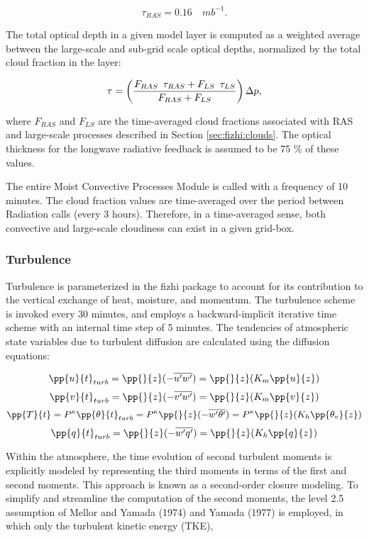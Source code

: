 \[ \tau_{RAS} = 0.16 \quad mb^{-1} . \]

The total optical depth in a given model layer is computed as a weighted average between
the large-scale and sub-grid scale optical depths, normalized by the total cloud fraction in the
layer:

\[ \tau = \left( {F_{RAS} \,\,\, \tau_{RAS} + F_{LS} \,\,\, \tau_{LS} \over F_{RAS}+F_{LS} } \right) \Delta p, \]

where $F_{RAS}$ and $F_{LS}$ are the time-averaged cloud fractions associated with RAS and large-scale
processes described in Section \ref{sec:fizhi:clouds}.
The optical thickness for the longwave radiative feedback is assumed to be 75 $\%$ of these values.

The entire Moist Convective Processes Module is called with a frequency of 10 minutes. 
The cloud fraction values are time-averaged over the period between Radiation calls (every 3
hours).  Therefore, in a time-averaged sense, both convective and large-scale 
cloudiness can exist in a given grid-box.  

\subsubsection{Turbulence}
Turbulence is parameterized in the fizhi package to account for its contribution to the
vertical exchange of heat, moisture, and momentum.  
The turbulence scheme is invoked every 30 minutes, and employs a backward-implicit iterative 
time scheme with an internal time step of 5 minutes.
The tendencies of atmospheric state variables due to turbulent diffusion are calculated using
the diffusion equations:

\[
{\pp{u}{t}}_{turb} = {\pp{}{z} }{(- \overline{u^{\prime}w^{\prime}})}
 = {\pp{}{z} }{(K_m \pp{u}{z})}
\]
\[
{\pp{v}{t}}_{turb} = {\pp{}{z} }{(- \overline{v^{\prime}w^{\prime}})}
 = {\pp{}{z} }{(K_m \pp{v}{z})}
\]
\[
{\pp{T}{t}} = P^{\kappa}{\pp{\theta}{t}}_{turb} = 
P^{\kappa}{\pp{}{z} }{(- \overline{w^{\prime}\theta^{\prime}})}
 = P^{\kappa}{\pp{}{z} }{(K_h \pp{\theta_v}{z})}
\]
\[
{\pp{q}{t}}_{turb} = {\pp{}{z} }{(- \overline{w^{\prime}q^{\prime}})}
 = {\pp{}{z} }{(K_h \pp{q}{z})}
\]

Within the atmosphere, the time evolution
of second turbulent moments is explicitly modeled by representing the third moments in terms of 
the first and second moments.  This approach is known as a second-order closure modeling.
To simplify and streamline the computation of the second moments, the level 2.5 assumption
of Mellor and Yamada (1974) and Yamada (1977) is employed, in which only the turbulent 
kinetic energy (TKE),

